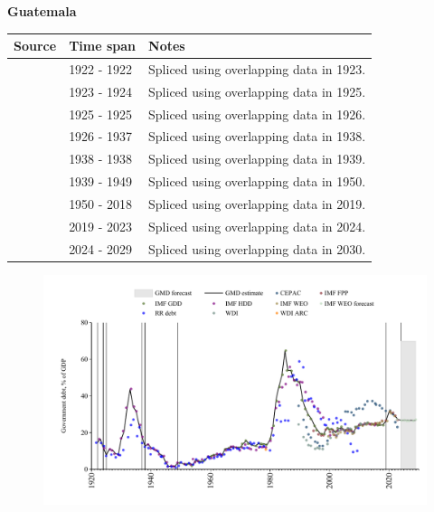 \documentclass[12pt,a4paper,landscape]{article}
\begin{document}
\begin{adjustbox}{max totalsize={\paperwidth}{\paperheight},center}
\begin{minipage}[t][\textheight][t]{\textwidth}
\vspace*{0.5cm}
{}
\begin{center}
{\Large\bfseries Guatemala}
\end{center}
\vspace{0.5cm}
\begin{table}[H]
\centering
\small
\begin{tabular}{|l|l|l|}
\hline
\textbf{Source} & \textbf{Time span} & \textbf{Notes} \\
\hline
\rowcolor{white}\cite{RR_debt}& 1922 - 1922 &Spliced using overlapping data in 1923.\\
\rowcolor{lightgray}\cite{IMF_HDD}& 1923 - 1924 &Spliced using overlapping data in 1925.\\
\rowcolor{white}\cite{RR_debt}& 1925 - 1925 &Spliced using overlapping data in 1926.\\
\rowcolor{lightgray}\cite{IMF_HDD}& 1926 - 1937 &Spliced using overlapping data in 1938.\\
\rowcolor{white}\cite{RR_debt}& 1938 - 1938 &Spliced using overlapping data in 1939.\\
\rowcolor{lightgray}\cite{IMF_HDD}& 1939 - 1949 &Spliced using overlapping data in 1950.\\
\rowcolor{white}\cite{IMF_GDD}& 1950 - 2018 &Spliced using overlapping data in 2019.\\
\rowcolor{lightgray}\cite{IMF_FPP}& 2019 - 2023 &Spliced using overlapping data in 2024.\\
\rowcolor{white}\cite{IMF_WEO_forecast}& 2024 - 2029 &Spliced using overlapping data in 2030.\\
\hline
\end{tabular}
\end{table}
\begin{figure}[H]
\centering
\includegraphics[width=\textwidth,height=0.6\textheight,keepaspectratio]{graphs/GTM_govdebt_GDP.pdf}
\end{figure}
\end{minipage}
\end{adjustbox}
\end{document}
